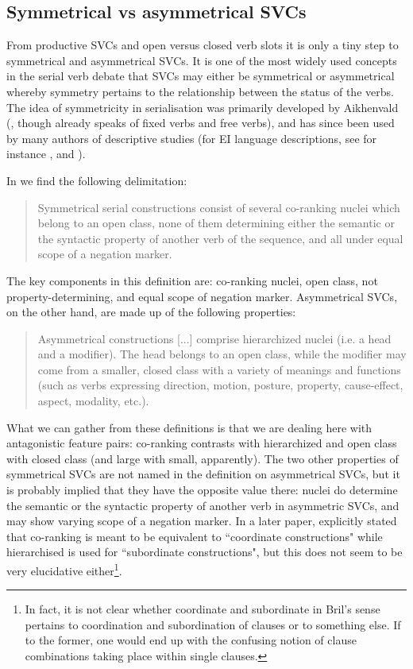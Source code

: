 \subsection{Symmetrical vs asymmetrical SVCs}

From productive SVCs and open versus closed verb slots it is only a tiny step to symmetrical and asymmetrical SVCs. It is one of the most widely used concepts in the serial verb debate that SVCs may either be symmetrical or asymmetrical whereby symmetry pertains to the relationship between the status of the verbs. The idea of symmetricity in serialisation was primarily developed by Aikhenvald (\citealt{aikhenvald1999serial, Aikhenvald2006}, though \citealt{sebba1987syntax} already speaks of fixed verbs and free verbs), and has since been used by many authors of descriptive studies (for EI language descriptions, see for instance \citealt{kratochvil2007grammar}, and \citealt{bowden2001taba}).

In \citet[5]{bril2004complex} we find the following delimitation: \begin{quote}Symmetrical serial constructions consist of several co-ranking nuclei which belong to an open class, none of them determining either the semantic or the syntactic property of another verb of the sequence, and all under equal scope of a negation marker.\end{quote}

The key components in this definition are: co-ranking nuclei, open class, not property-determining, and equal scope of negation marker. Asymmetrical SVCs, on the other hand, are made up of the following properties: \begin{quote}Asymmetrical constructions [...] comprise hierarchized nuclei (i.e. a head and a modifier). The head belongs to an open class, while the modifier may come from a smaller, closed class with a variety of meanings and functions (such as verbs expressing direction, motion, posture, property, cause-effect, aspect, modality, etc.).\end{quote}

What we can gather from these definitions is that we are dealing here with antagonistic feature pairs: co-ranking contrasts with hierarchized and open class with closed class (and large with small, apparently). The two other properties of symmetrical SVCs are not named in the definition on asymmetrical SVCs, but it is probably implied that they have the opposite value there: nuclei do determine the semantic or the syntactic property of another verb in asymmetric SVCs, and may show varying scope of a negation marker. In a later paper, \citet{bril2007nexus} explicitly stated that co-ranking is meant to be equivalent to ``coordinate constructions" while hierarchised is used for ``subordinate constructions", but this does not seem to be very elucidative either\footnote{In fact, it is not clear whether coordinate and subordinate in Bril's sense pertains to coordination and subordination of clauses or to something else. If to the former, one would end up with the confusing notion of clause combinations taking place within single clauses.}.

